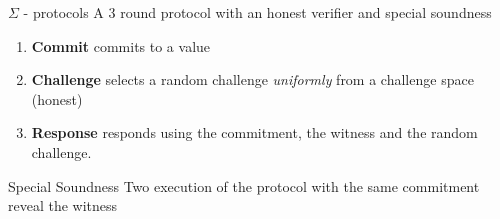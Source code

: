 \documentclass[handouts]{beamer}
\begin{document}
\begin{frame}{$\Sigma$ - protocols}
A 3 round protocol with an honest verifier and special soundness \pause
\begin{enumerate}
	\item \textbf{Commit} \prv commits to a value
	\item \textbf{Challenge} \ver selects a random challenge \emph{uniformly} from a challenge space (honest) 
	\item \textbf{Response} \prv responds using the commitment, the witness and the random challenge.
\end{enumerate}
\pause
\begin{block}{Special Soundness}
Two execution of the protocol with the same commitment reveal the witness
\end{block}
\end{frame}
\end{document}
